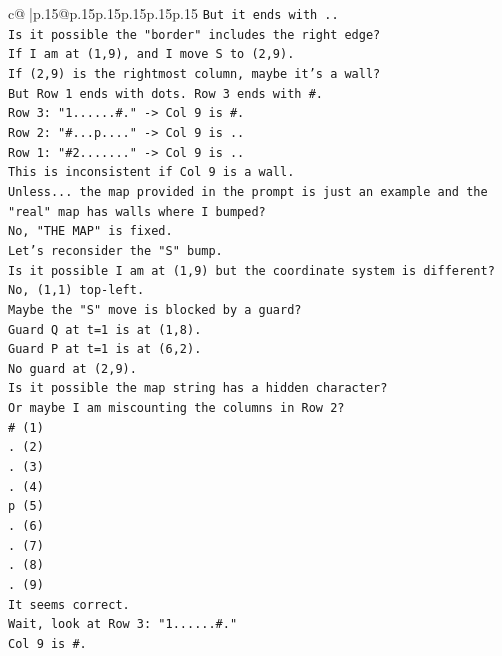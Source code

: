 \documentclass{article}
\begin{document}
{\begin{supertabular}{c@{$\;$}|p{.15\linewidth}@{}p{.15\linewidth}p{.15\linewidth}p{.15\linewidth}p{.15\linewidth}p{.15\linewidth}}
{{{\texttt{But it ends with ..} \\
\texttt{Is it possible the "border" includes the right edge?} \\
\texttt{If I am at (1,9), and I move S to (2,9).} \\
\texttt{If (2,9) is the rightmost column, maybe it's a wall?} \\
\texttt{But Row 1 ends with dots. Row 3 ends with \#.} \\
\texttt{Row 3: "1......\#." {-}> Col 9 is \#.} \\
\texttt{Row 2: "\#...p...." {-}> Col 9 is ..} \\
\texttt{Row 1: "\#2......." {-}> Col 9 is ..} \\
\texttt{This is inconsistent if Col 9 is a wall.} \\
\texttt{Unless... the map provided in the prompt is just an example and the "real" map has walls where I bumped?} \\
\texttt{No, "THE MAP" is fixed.} \\
\texttt{Let's reconsider the "S" bump.} \\
\texttt{Is it possible I am at (1,9) but the coordinate system is different?} \\
\texttt{No, (1,1) top{-}left.} \\
\texttt{Maybe the "S" move is blocked by a guard?} \\
\texttt{Guard Q at t=1 is at (1,8).} \\
\texttt{Guard P at t=1 is at (6,2).} \\
\texttt{No guard at (2,9).} \\
\texttt{Is it possible the map string has a hidden character?} \\
\texttt{Or maybe I am miscounting the columns in Row 2?} \\
\texttt{\# (1)} \\
\texttt{. (2)} \\
\texttt{. (3)} \\
\texttt{. (4)} \\
\texttt{p (5)} \\
\texttt{. (6)} \\
\texttt{. (7)} \\
\texttt{. (8)} \\
\texttt{. (9)} \\
\texttt{It seems correct.} \\
\texttt{Wait, look at Row 3: "1......\#."} \\
\texttt{Col 9 is \#.} \\
}}}
\end{supertabular}}
\end{document}
